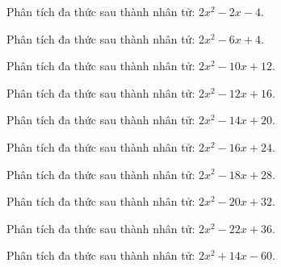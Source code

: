 \begin{bt}
	Phân tích đa thức sau thành nhân tử: $2 x^2 - 2 x - 4$.
\end{bt}
\begin{bt}
	Phân tích đa thức sau thành nhân tử: $2 x^2 - 6 x + 4$.
\end{bt}
\begin{bt}
	Phân tích đa thức sau thành nhân tử: $2 x^2 - 10 x + 12$.
\end{bt}
\begin{bt}
	Phân tích đa thức sau thành nhân tử: $2 x^2 - 12 x + 16$.
\end{bt}
\begin{bt}
	Phân tích đa thức sau thành nhân tử: $2 x^2 - 14 x + 20$.
\end{bt}
\begin{bt}
	Phân tích đa thức sau thành nhân tử: $2 x^2 - 16 x + 24$.
\end{bt}
\begin{bt}
	Phân tích đa thức sau thành nhân tử: $2 x^2 - 18 x + 28$.
\end{bt}
\begin{bt}
	Phân tích đa thức sau thành nhân tử: $2 x^2 - 20 x + 32$.
\end{bt}
\begin{bt}
	Phân tích đa thức sau thành nhân tử: $2 x^2 - 22 x + 36$.
\end{bt}
\begin{bt}
	Phân tích đa thức sau thành nhân tử: $2 x^2 + 14 x - 60$.
\end{bt}
